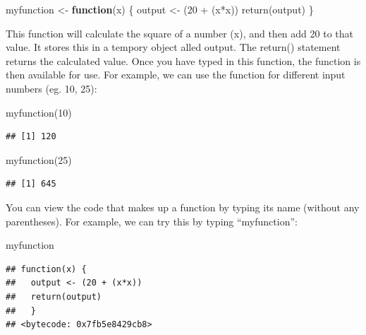 \documentclass[
]{book}
\newenvironment{Shaded}{\begin{snugshade}}{\end{snugshade}}
\newcommand{\ControlFlowTok}[1]{\textcolor[rgb]{0.13,0.29,0.53}{\textbf{#1}}}
\newcommand{\DecValTok}[1]{\textcolor[rgb]{0.00,0.00,0.81}{#1}}
\newcommand{\FunctionTok}[1]{\textcolor[rgb]{0.00,0.00,0.00}{#1}}
\newcommand{\NormalTok}[1]{#1}
\newcommand{\OtherTok}[1]{\textcolor[rgb]{0.56,0.35,0.01}{#1}}
\newcommand{\SpecialCharTok}[1]{\textcolor[rgb]{0.00,0.00,0.00}{#1}}
\begin{document}
\begin{Shaded}
\begin{Highlighting}[]
\NormalTok{myfunction }\OtherTok{\textless{}{-}} \ControlFlowTok{function}\NormalTok{(x) \{ }
\NormalTok{  output }\OtherTok{\textless{}{-}}\NormalTok{ (}\DecValTok{20} \SpecialCharTok{+}\NormalTok{ (x}\SpecialCharTok{*}\NormalTok{x)) }
  \FunctionTok{return}\NormalTok{(output)}
\NormalTok{  \}}
\end{Highlighting}
\end{Shaded}

This function will calculate the square of a number (x), and then add 20 to that value. It stores this in a tempory object alled output. The return() statement returns the calculated value. Once you have typed in this function, the function is then available for use. For example, we can use the function for different input numbers (eg. 10, 25):

\begin{Shaded}
\begin{Highlighting}[]
\FunctionTok{myfunction}\NormalTok{(}\DecValTok{10}\NormalTok{)}
\end{Highlighting}
\end{Shaded}

\begin{verbatim}
## [1] 120
\end{verbatim}

\begin{Shaded}
\begin{Highlighting}[]
\FunctionTok{myfunction}\NormalTok{(}\DecValTok{25}\NormalTok{)}
\end{Highlighting}
\end{Shaded}

\begin{verbatim}
## [1] 645
\end{verbatim}

You can view the code that makes up a function by typing its name (without any parentheses). For example, we can try this by typing ``myfunction'':

\begin{Shaded}
\begin{Highlighting}[]
\NormalTok{myfunction}
\end{Highlighting}
\end{Shaded}

\begin{verbatim}
## function(x) { 
##   output <- (20 + (x*x)) 
##   return(output)
##   }
## <bytecode: 0x7fb5e8429cb8>
\end{verbatim}
\end{document}
